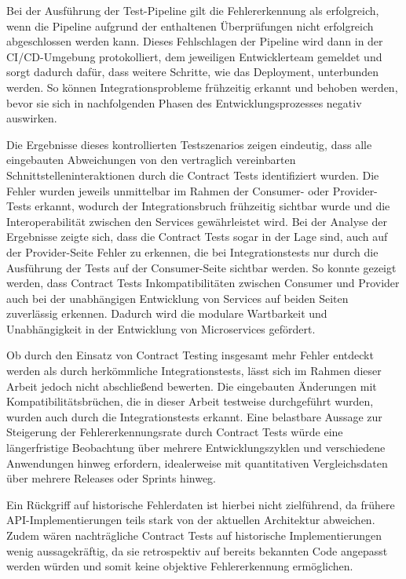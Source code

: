 Bei der Ausführung der Test-\gls{Pipeline} gilt die Fehlererkennung als erfolgreich, wenn die \gls{Pipeline} aufgrund der enthaltenen Überprüfungen nicht erfolgreich abgeschlossen werden kann.
Dieses Fehlschlagen der \gls{Pipeline} wird dann in der \gls{CI}/\gls{CD}-Umgebung protokolliert, dem jeweiligen Entwicklerteam gemeldet und sorgt dadurch dafür, dass weitere Schritte, wie das \gls{Deployment}, unterbunden werden.
So können Integrationsprobleme frühzeitig erkannt und behoben werden, bevor sie sich in nachfolgenden Phasen des Entwicklungsprozesses negativ auswirken.

Die Ergebnisse dieses kontrollierten Testszenarios zeigen eindeutig, dass alle eingebauten Abweichungen von den vertraglich vereinbarten Schnittstelleninteraktionen durch die Contract Tests identifiziert wurden.
Die Fehler wurden jeweils unmittelbar im Rahmen der Consumer- oder Provider-Tests erkannt, wodurch der Integrationsbruch frühzeitig sichtbar wurde und die Interoperabilität zwischen den Services gewährleistet wird.
Bei der Analyse der Ergebnisse zeigte sich, dass die Contract Tests sogar in der Lage sind, auch auf der Provider-Seite Fehler zu erkennen, die bei Integrationstests nur durch die Ausführung der Tests auf der Consumer-Seite sichtbar werden.
So konnte gezeigt werden, dass Contract Tests Inkompatibilitäten zwischen Consumer und Provider auch bei der unabhängigen Entwicklung von Services auf beiden Seiten zuverlässig erkennen.
Dadurch wird die modulare Wartbarkeit und Unabhängigkeit in der Entwicklung von Microservices gefördert.

Ob durch den Einsatz von Contract Testing insgesamt mehr Fehler entdeckt werden als durch herkömmliche Integrationstests, lässt sich im Rahmen dieser Arbeit jedoch nicht abschließend bewerten.
Die eingebauten Änderungen mit Kompatibilitätsbrüchen, die in dieser Arbeit testweise durchgeführt wurden, wurden auch durch die Integrationstests erkannt.
Eine belastbare Aussage zur Steigerung der Fehlererkennungsrate durch Contract Tests würde eine längerfristige Beobachtung über mehrere Entwicklungszyklen und verschiedene Anwendungen hinweg erfordern, idealerweise mit quantitativen Vergleichsdaten über mehrere Releases oder Sprints hinweg.

Ein Rückgriff auf historische Fehlerdaten ist hierbei nicht zielführend, da frühere \gls{API}-Implementierungen teils stark von der aktuellen Architektur abweichen.
Zudem wären nachträgliche Contract Tests auf historische Implementierungen wenig aussagekräftig, da sie retrospektiv auf bereits bekannten Code angepasst werden würden und somit keine objektive Fehlererkennung ermöglichen.

